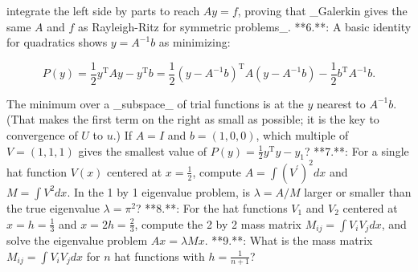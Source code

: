 integrate the left side by parts to reach \(Ay=f\), proving that _Galerkin gives the same \(A\) and \(f\) as Rayleigh-Ritz for symmetric problems_.
**6.**: A basic identity for quadratics shows \(y=A^{-1}b\) as minimizing:

\[P(y)=\frac{1}{2}y^{\mathrm{T}}Ay-y^{\mathrm{T}}b=\frac{1}{2}(y-A^{-1}b)^{ \mathrm{T}}A(y-A^{-1}b)-\frac{1}{2}b^{\mathrm{T}}A^{-1}b.\]

The minimum over a _subspace_ of trial functions is at the \(y\) nearest to \(A^{-1}b\). (That makes the first term on the right as small as possible; it is the key to convergence of \(U\) to \(u\).) If \(A=I\) and \(b=(1,0,0)\), which multiple of \(V=(1,1,1)\) gives the smallest value of \(P(y)=\frac{1}{2}y^{\mathrm{T}}y-y_{1}\)?
**7.**: For a single hat function \(V(x)\) centered at \(x=\frac{1}{2}\), compute \(A=\int(V^{\prime})^{2}dx\) and \(M=\int V^{2}dx\). In the 1 by 1 eigenvalue problem, is \(\lambda=A/M\) larger or smaller than the true eigenvalue \(\lambda=\pi^{2}\)?
**8.**: For the hat functions \(V_{1}\) and \(V_{2}\) centered at \(x=h=\frac{1}{3}\) and \(x=2h=\frac{2}{3}\), compute the 2 by 2 mass matrix \(M_{ij}=\int V_{i}V_{j}dx\), and solve the eigenvalue problem \(Ax=\lambda Mx\).
**9.**: What is the mass matrix \(M_{ij}=\int V_{i}V_{j}dx\) for \(n\) hat functions with \(h=\frac{1}{n+1}\)? 